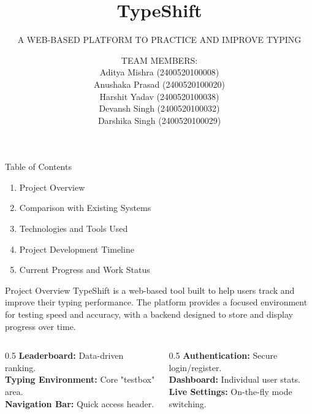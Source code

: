 \documentclass{beamer}
\title{TypeShift}
\subtitle{A WEB-BASED PLATFORM TO PRACTICE AND IMPROVE TYPING}
\author{TEAM MEMBERS: \\ 
Aditya Mishra (2400520100008) \\ 
Anushaka Prasad (2400520100020) \\ 
Harshit Yadav (2400520100038) \\ 
Devansh Singh (2400520100032) \\ 
Darshika Singh (2400520100029)}
\date{}
\begin{document}
\begin{frame}
    \titlepage
\end{frame}

\begin{frame}{Table of Contents}
    \begin{enumerate}
        \item Project Overview
        \item Comparison with Existing Systems
        \item Technologies and Tools Used
        \item Project Development Timeline
        \item Current Progress and Work Status
    \end{enumerate}
\end{frame}

\begin{frame}{Project Overview}
    TypeShift is a web-based tool built to help users track and improve their typing performance. The platform provides a focused environment for testing speed and accuracy, with a backend designed to store and display progress over time.
    \vfill
    \begin{columns}[t]
        \begin{column}{0.5\textwidth}
            \textbf{\color{TypeShiftPurple}Leaderboard:} Data-driven ranking. \\
            \textbf{\color{TypeShiftPurple}Typing Environment:} Core "testbox" area. \\
            \textbf{\color{TypeShiftPurple}Navigation Bar:} Quick access header.
        \end{column}
        \begin{column}{0.5\textwidth}
            \textbf{\color{TypeShiftPurple}Authentication:} Secure login/register. \\
            \textbf{\color{TypeShiftPurple}Dashboard:} Individual user stats. \\
            \textbf{\color{TypeShiftPurple}Live Settings:} On-the-fly mode switching.
        \end{column}
    \end{columns}
\end{frame}
\end{document}
